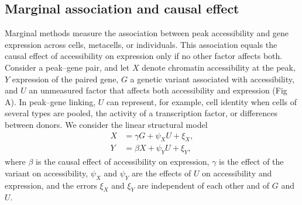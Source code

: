 
\subsection*{Marginal association and causal effect}
\label{s1sec:marginal}

\noindent Marginal methods measure the association between peak accessibility and gene expression across cells, metacells, or individuals. This association equals the causal effect of accessibility on expression only if no other factor affects both. Consider a peak--gene pair, and let $X$ denote chromatin accessibility at the peak, $Y$ expression of the paired gene, $G$ a genetic variant associated with accessibility, and $U$ an unmeasured factor that affects both accessibility and expression (Fig A). In peak--gene linking, $U$ can represent, for example, cell identity when cells of several types are pooled, the activity of a transcription factor, or differences between donors. We consider the linear structural model
\begin{align*}
X &= \gamma G + \psi_X U + \xi_X,\\
Y &= \beta X + \psi_Y U + \xi_Y,
\end{align*}
where $\beta$ is the causal effect of accessibility on expression, $\gamma$ is the effect of the variant on accessibility, $\psi_X$ and $\psi_Y$ are the effects of $U$ on accessibility and expression, and the errors $\xi_X$ and $\xi_Y$ are independent of each other and of $G$ and $U$.

